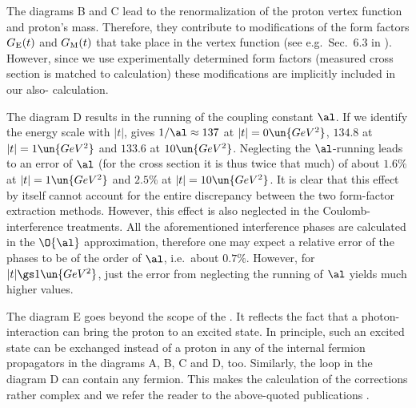 The diagrams  B and C lead to the renormalization of the proton vertex function and proton's mass. Therefore, they contribute to modifications of the form factors $G_{\rm E}(t)$ and $G_{\rm M}(t)$ that take place in the  vertex function (see e.g.~Sec.~6.3 in ). However, since we use experimentally determined form factors (measured cross section is matched to  calculation) these modifications are implicitly included in our also- calculation.

The diagram  D results in the running of the coupling constant $\al$. If we identify the energy scale with $|t|$,  gives $1/\al \approx 137$ at $|t| = 0\un{GeV^2}$, $134.8$ at $|t| = 1 \un{GeV^2}$ and $133.6$ at $10\un{GeV^2}$. Neglecting the $\al$-running leads to an error of $\al$ (for the cross section it is thus twice that much) of about $1.6\percent$ at $|t| = 1 \un{GeV^2}$ and $2.5\percent$ at $|t| = 10 \un{GeV^2}$. It is clear that this effect by itself cannot account for the entire discrepancy between the two form-factor extraction methods. However, this effect is also neglected in the Coulomb-interference treatments. All the aforementioned interference phases are calculated in the $\O{\al}$ approximation, therefore one may expect a relative error of the phases to be of the order of $\al$, i.e.~about $0.7\percent$. However, for $|t| \gs 1\un{GeV^2}$, just the error from neglecting the running of $\al$ yields much higher values.

The diagram  E goes beyond the scope of the . It reflects the fact that a photon-interaction can bring the proton to an excited state. In principle, such an excited state can be exchanged instead of a proton in any of the internal fermion propagators in the diagrams A, B, C and D, too. Similarly, the loop in the diagram D can contain any fermion. This makes the calculation of the  corrections rather complex and we refer the reader to the above-quoted publications .


